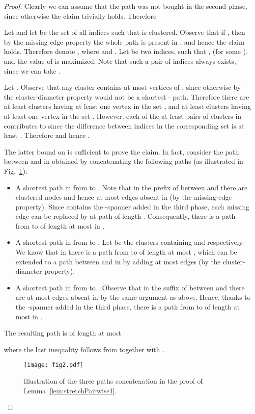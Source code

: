 \documentclass[a4paper,11pt]{article}
\theoremstyle{definition}
\begin{document}
\begin{proof}
Clearly we can assume that the path  was not bought in the second phase,
since otherwise the claim trivially holds.
Therefore 


Let 
and let  be the set of all indices
 such that  is clustered.
Observe that if , then by the missing-edge property
the whole path  is present in , and hence the claim holds.
Therefore denote , where  and .
Let  be two indices, such that ,  (for some ),
 and the value of  is maximized.
Note that such a pair of indices  always exists, since we can take .

Let . Observe that any cluster  contains at most  vertices of ,
since otherwise by the cluster-diameter property  
would not be a shortest - path.
Therefore there are at least  clusters  having at least one vertex in the set ,
and at least  clusters  having at least one vertex in the set .
However, each of the at least  pairs of clusters in  contributes to  
since the difference between indices in the corresponding set is at least 
.
Therefore  and hence
.

The latter bound on  is sufficient to prove the claim. In fact, consider the path between  and  in  obtained by concatenating the following paths
(as illustrated in Fig.~\ref{fig2}):
\begin{itemize}
  \item A shortest path in  from  to . Note that in the prefix of  between  and  there
  are  clustered nodes and hence at most  edges absent in  (by the missing-edge property). Since  contains the -spanner added in the third phase, each missing edge can be replaced by at path of length . Consequently, there is a path from  to  of length at most  in .
  \item A shortest path in  from  to . Let  be the clusters containing  and  respectively.
  We know that in  there is a path from  to  of length at most ,
  which can be extended to a path between  and  in  by adding at most  edges
  (by the cluster-diameter property).
  \item A shortest path in  from  to . Observe that in the suffix of  between  and 
  there are at most  edges absent in  by the same argument as above. Hence, thanks to the -spanner added in the third phase, there is a path from  to  of length at most  in .
\end{itemize}
The resulting path is of length at most 
 
where the last inequality
follows from  together with .
\begin{figure}[t]
\begin{center}
\texttt{[image: fig2.pdf]}
\end{center}
\caption{Illustration of the three paths concatenation in the proof of Lemma~\ref{lem:stretchPairwise1}.}
\label{fig2}
\end{figure}
\end{proof}
\end{document}
